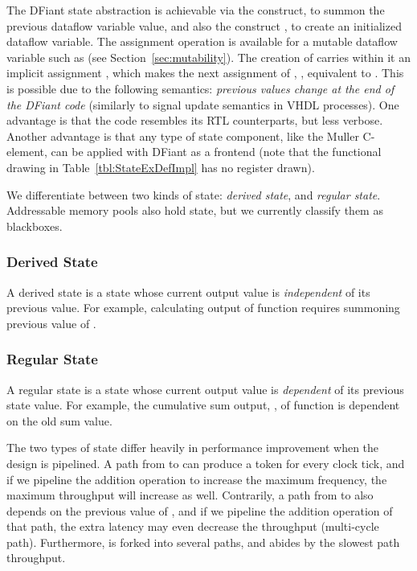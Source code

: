 The DFiant state abstraction is achievable via the  construct, to summon the previous dataflow variable value, and also the construct , to create an initialized dataflow variable. The \code{:=} assignment operation is available for a mutable dataflow variable such as  (see Section~\ref{sec:mutability}). The creation of  carries within it an implicit assignment , which makes the next assignment of , , equivalent to . This is possible due to the following semantics: \textit{previous values change at the end of the DFiant code} (similarly to signal update semantics in VHDL processes). One advantage is that the code resembles its RTL counterparts, but less verbose. Another advantage is that any type of state component, like the Muller C-element\cite{muller1957theory}, can be applied with DFiant as a frontend (note that the functional drawing in Table~\ref{tbl:StateExDefImpl} has no register drawn).


We differentiate between two kinds of state: \textit{derived state}, and \textit{regular state}. Addressable memory pools also hold state, but we currently classify them as blackboxes. %

\subsubsection{Derived State} 
A derived state is a state whose current output value is \textit{independent} of its previous value. For example, calculating output  of function  requires summoning previous value of . 

\subsubsection{Regular State} 
A regular state is a state whose current output value is \textit{dependent} of its previous state value. For example, the cumulative sum output, , of function  is dependent on the old sum value. 

The two types of state differ heavily in performance improvement when the design is pipelined. A path from  to  can produce a token for every clock tick, and if we pipeline the addition operation to increase the maximum frequency, the maximum throughput will increase as well. Contrarily, a path from  to  also depends on the previous value of , and if we pipeline the addition operation of that path, the extra latency may even decrease the throughput (multi-cycle path). Furthermore,  is forked into several paths, and  abides by the slowest path throughput. 

